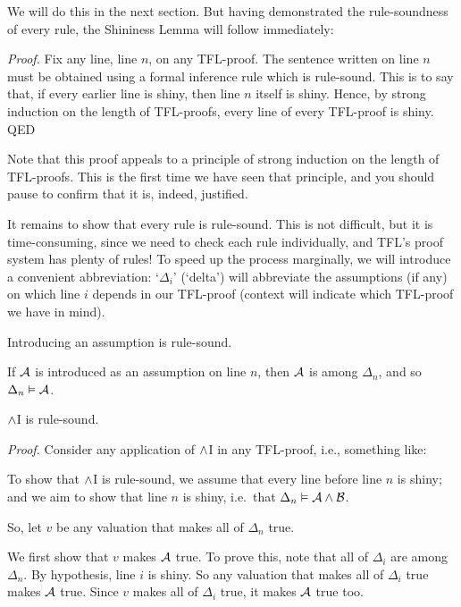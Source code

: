 We will do this in the next section. But having demonstrated the rule-soundness of every rule, the Shininess Lemma will follow immediately:

\emph{Proof.} Fix any line, line $n$, on any TFL-proof. The sentence written on line $n$ must be obtained using a formal inference rule which is rule-sound. This is to say that, if every earlier line is shiny, then line $n$ itself is shiny. Hence, by strong induction on the length of TFL-proofs, every line of every TFL-proof is shiny. QED

Note that this proof appeals to a principle of strong induction on the length of TFL-proofs. This is the first time we have seen that principle, and you should pause to confirm that it is, indeed, justified.

It remains to show that every rule is rule-sound. This is not difficult, but it is time-consuming, since we need to check each rule individually, and TFL's proof system has plenty of rules! To speed up the process marginally, we will introduce a convenient abbreviation: `$\Delta_i$' (`delta') will abbreviate the assumptions (if any) on which line $i$ depends in our TFL-proof (context will indicate which TFL-proof we have in mind).

\begin{factoidboxe}Introducing an assumption is rule-sound.
\end{factoidboxe}

If $\mathcal{A}$ is introduced as an assumption on line $n$, then $\mathcal{A}$ is among $\Delta_n$, and so $\Delta_n \vDash \mathcal{A}$.

\begin{factoidboxe}$\wedge$I is rule-sound.
\end{factoidboxe}

\emph{Proof.} Consider any application of $\wedge$I in any TFL-proof, i.e., something like:
\begin{fitchproof}
	 
\end{fitchproof}\noindent
To show that $\wedge$I is rule-sound, we assume that every line before line $n$ is shiny; and we aim to show that line $n$ is shiny, i.e.\ that $\Delta_n \vDash \mathcal{A} \wedge \mathcal{B}$.

So, let $v$ be any valuation that makes all of $\Delta_{n}$ true.

We first show that $v$ makes $\mathcal{A}$ true. To prove this, note that all of $\Delta_i$ are among $\Delta_{n}$. By hypothesis, line $i$ is shiny. So any valuation that makes all of $\Delta_i$ true makes $\mathcal{A}$ true. Since $v$ makes all of $\Delta_i$ true, it makes $\mathcal{A}$ true too.

